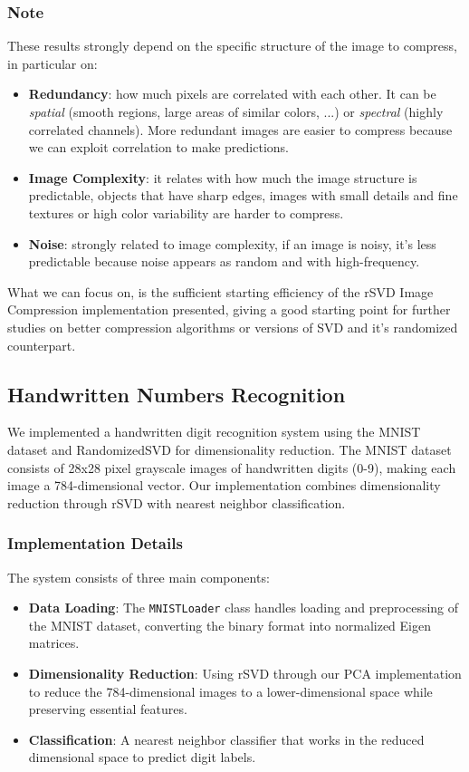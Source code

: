 \documentclass[11pt,a4paper]{article}
\begin{document}
\subsubsection{Note}
These results strongly depend on the specific structure of the image to compress, in particular on:
\begin{itemize} [label=-]
    \item \textbf{Redundancy}: how much pixels are correlated with each other. It can be \textit{spatial} (smooth regions, large areas of similar colors, ...) or \textit{spectral} (highly correlated channels). More redundant images are easier to compress because we can exploit correlation to make predictions.
    \item \textbf{Image Complexity}: it relates with how much the image structure is predictable, objects that have sharp edges, images with small details and fine textures or high color variability are harder to compress.
    \item \textbf{Noise}: strongly related to image complexity, if an image is noisy, it's less predictable because noise appears as random and with high-frequency.
\end{itemize}
What we can focus on, is the sufficient starting efficiency of the rSVD Image Compression implementation presented, giving a good starting point for further studies on better compression algorithms or versions of SVD and it's randomized counterpart.


\subsection{Handwritten Numbers Recognition}
We implemented a handwritten digit recognition system using the MNIST dataset and RandomizedSVD for dimensionality reduction. The MNIST dataset consists of 28x28 pixel grayscale images of handwritten digits (0-9), making each image a 784-dimensional vector. Our implementation combines dimensionality reduction through rSVD with nearest neighbor classification.

\subsubsection{Implementation Details}
The system consists of three main components:

\begin{itemize}
    \item \textbf{Data Loading}: The \texttt{MNISTLoader} class handles loading and preprocessing of the MNIST dataset, converting the binary format into normalized Eigen matrices.
    \item \textbf{Dimensionality Reduction}: Using rSVD through our PCA implementation to reduce the 784-dimensional images to a lower-dimensional space while preserving essential features.
    \item \textbf{Classification}: A nearest neighbor classifier that works in the reduced dimensional space to predict digit labels.
\end{itemize}
\end{document}
